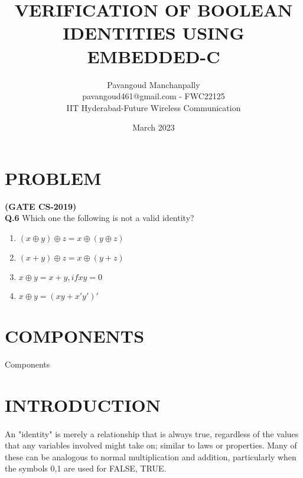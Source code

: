 \documentclass{article}
\title{VERIFICATION OF BOOLEAN IDENTITIES USING EMBEDDED-C}
\date{March 2023}
\author{Pavangoud Manchanpally \\pavangoud461@gmail.com - FWC22125\\IIT Hyderabad-Future Wireless Communication}
\date{}
\begin{document}
\maketitle
\tableofcontents
	\pagebreak
\section{PROBLEM}
\textbf{(GATE CS-2019)}\\
\textbf{Q.6} Which one the following is not a valid identity?
\begin{enumerate}[label=(\Alph*)]
	\item $ (x\oplus y)\oplus z = x\oplus (y\oplus z)$
	\item $ (x + y)\oplus z = x\oplus (y + z)$
	\item $ x\oplus y = x + y, if xy = 0$
	\item $ x\oplus y = (xy + x'y')'$
\end{enumerate}
\bigskip

\section{COMPONENTS}

\begin{table}[h]
\centering

\caption{Components}
\label{table:Components}
\end{table}
\vspace{5mm}

\section{INTRODUCTION}
\paragraph{}
	An "identity" is merely a relationship that is always true, regardless of the values that any variables involved might take on; similar to laws or properties. Many of these can be analogous to normal multiplication and addition, particularly when the symbols {0,1} are used for {FALSE, TRUE}. 
\bigskip 
\end{document}
